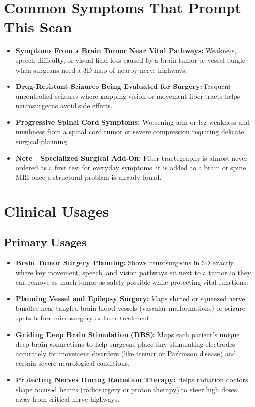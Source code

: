 \section{Common Symptoms That Prompt This Scan}
\begin{itemize}
    \item \textbf{Symptoms From a Brain Tumor Near Vital Pathways:} Weakness, speech difficulty, or visual field loss caused by a brain tumor or vessel tangle when surgeons need a 3D map of nearby nerve highways.
    \item \textbf{Drug-Resistant Seizures Being Evaluated for Surgery:} Frequent uncontrolled seizures where mapping vision or movement fiber tracts helps neurosurgeons avoid side effects.
    \item \textbf{Progressive Spinal Cord Symptoms:} Worsening arm or leg weakness and numbness from a spinal cord tumor or severe compression requiring delicate surgical planning.
    \item \textbf{Note---Specialized Surgical Add-On:} Fiber tractography is almost never ordered as a first test for everyday symptoms; it is added to a brain or spine MRI once a structural problem is already found.
\end{itemize}

\section{Clinical Usages}

\subsection{Primary Usages}

\begin{itemize}
    \item \textbf{Brain Tumor Surgery Planning:} Shows neurosurgeons in 3D exactly where key movement, speech, and vision pathways sit next to a tumor so they can remove as much tumor as safely possible while protecting vital functions.
    \item \textbf{Planning Vessel and Epilepsy Surgery:} Maps shifted or squeezed nerve bundles near tangled brain blood vessels (vascular malformations) or seizure spots before microsurgery or laser treatment.
    \item \textbf{Guiding Deep Brain Stimulation (DBS):} Maps each patient's unique deep brain connections to help surgeons place tiny stimulating electrodes accurately for movement disorders (like tremor or Parkinson disease) and certain severe neurological conditions.
    \item \textbf{Protecting Nerves During Radiation Therapy:} Helps radiation doctors shape focused beams (radiosurgery or proton therapy) to steer high doses away from critical nerve highways.
\end{itemize}

